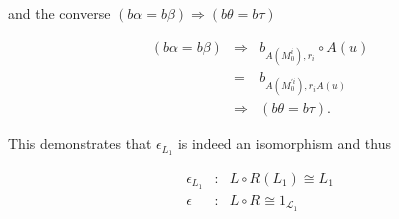 \begin{frame}
and the converse $(b \alpha = b \beta) \Rightarrow (b \theta = b \tau)$
\begin{block}{}
\abovedisplayskip=0pt
\begin{eqnarray*}
(b \alpha = b \beta) &\Rightarrow & b_{A(M_0^i),r_i} \circ A(u) \\
&=& b_{A(M_0^{'i}),r_i A(u)}\\
&\Rightarrow & (b \theta = b \tau).
\end{eqnarray*}
\end{block}
This demonstrates that $\epsilon_{L_1}$ is indeed an isomorphism and thus
\begin{block}{}
\abovedisplayskip=0pt
\begin{eqnarray*}
\epsilon_{L_1} &:& L \circ R(L_1) \cong L_1\\
\epsilon &:& L \circ R \cong 1_{\mathcal{L}_1}
\end{eqnarray*}
\end{block}
\end{frame}